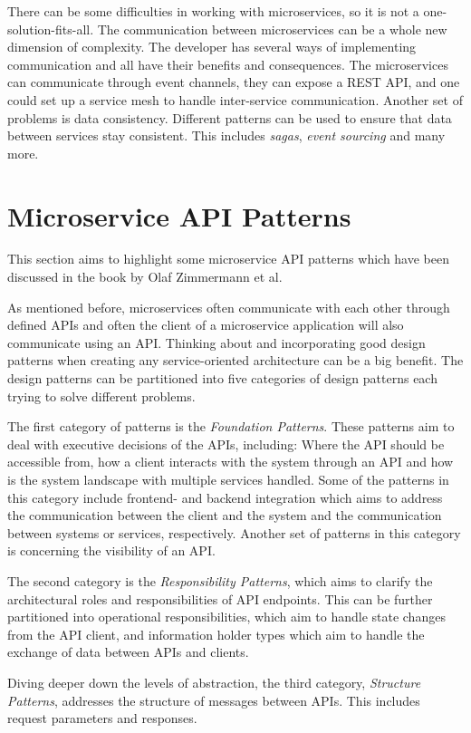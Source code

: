 There can be some difficulties in working with microservices, so it is not a one-solution-fits-all.
The communication between microservices can be a whole new dimension of complexity. The developer has several ways of implementing communication
and all have their benefits and consequences. The microservices can communicate through event channels, they can expose a REST API, and one could set up a service mesh to handle inter-service communication.
Another set of problems is data consistency. Different patterns can be used to ensure that data between services stay consistent. This includes \textit{sagas}, \textit{event sourcing} and many more.

\section{Microservice API Patterns}
This section aims to highlight some microservice API patterns which have been discussed in the book by Olaf Zimmermann et al.

As mentioned before, microservices often communicate with each other through defined APIs and often the client of a microservice application will also communicate using an API.
Thinking about and incorporating good design patterns when creating any service-oriented architecture can be a big benefit.
The design patterns can be partitioned into five categories of design patterns each trying to solve different problems.

The first category of patterns is the \textit{Foundation Patterns}. These patterns aim to deal with executive decisions of the APIs, including: Where the API should be
accessible from, how a client interacts with the system through an API and how is the system landscape with multiple services handled. Some of the patterns in this category include frontend- and backend integration which aims
to address the communication between the client and the system and the communication between systems or services, respectively. Another set of patterns in this category is concerning the visibility of an API.

The second category is the \textit{Responsibility Patterns}, which aims to clarify the architectural roles and responsibilities of API endpoints.
This can be further partitioned into operational responsibilities, which aim to handle state changes from the API client, and information holder types which aim to handle the exchange of data between APIs and clients.

Diving deeper down the levels of abstraction, the third category, \textit{Structure Patterns}, addresses the structure of messages between APIs. This includes request parameters and responses.

